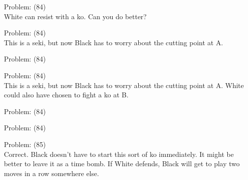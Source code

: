 \documentclass[11pt]{article}
\begin{document}
\begin{minipage}[t]{0.5\textwidth}
  {\centering
  
  Problem: (84)\\
  White can resist with a ko. Can you do better?\\
  }
\end{minipage}
\begin{minipage}[t]{0.5\textwidth}
  {\centering
  
  Problem: (84)\\
  This is a seki, but now Black has to worry about the cutting point at A.\\
  }
\end{minipage}
\begin{minipage}[t]{0.5\textwidth}
  {\centering
  
  Problem: (84)\\
  
  }
\end{minipage}
\begin{minipage}[t]{0.5\textwidth}
  {\centering
  
  Problem: (84)\\
  This is a seki, but now Black has to worry about the cutting point at A. White could also have chosen to fight a ko at B.\\
  }
\end{minipage}
\begin{minipage}[t]{0.5\textwidth}
  {\centering
  
  Problem: (84)\\
  
  }
\end{minipage}
\begin{minipage}[t]{0.5\textwidth}
  {\centering
  
  Problem: (84)\\
  
  }
\end{minipage}
\begin{minipage}[t]{0.5\textwidth}
  {\centering
  
  Problem: (85)\\
  Correct. Black doesn't have to start this sort of ko immediately. It might be better to leave it as a time bomb. If White defends, Black will get to play two moves in a row somewhere else.\\
  }
\end{minipage}
\end{document}
